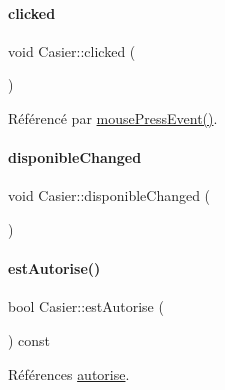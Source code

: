 \mbox{\label{class_casier_a6f147d5151d266424cc84b114ccf073b}} 
\paragraph{\texorpdfstring{clicked}{clicked}\hspace{0.1cm}{\footnotesize\ttfamily [2/2]}}
{\footnotesize\ttfamily void Casier\+::clicked (\begin{DoxyParamCaption}{ }\end{DoxyParamCaption})\hspace{0.3cm}{\ttfamily [signal]}}



Référencé par \hyperlink{class_casier_ad12cf89b6a99254f529997003adcf029}{mouse\+Press\+Event()}.

\mbox{\label{class_casier_afb79177c7c523f90c9a384522babf9e6}} 
\paragraph{\texorpdfstring{disponible\+Changed}{disponibleChanged}}
{\footnotesize\ttfamily void Casier\+::disponible\+Changed (\begin{DoxyParamCaption}{ }\end{DoxyParamCaption})\hspace{0.3cm}{\ttfamily [signal]}}

\mbox{\label{class_casier_adc6f3502e2bc9bdafed9634f649b285c}} 
\paragraph{\texorpdfstring{est\+Autorise()}{estAutorise()}}
{\footnotesize\ttfamily bool Casier\+::est\+Autorise (\begin{DoxyParamCaption}{ }\end{DoxyParamCaption}) const}



Références \hyperlink{class_casier_a2dd9fbe4a93685080a9b5c8f69e3f29a}{autorise}.


